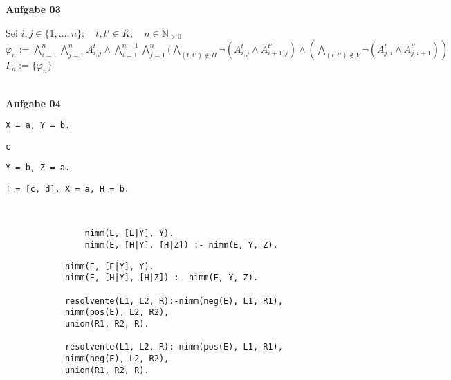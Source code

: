 \documentclass[a4paper,10pt]{article}
\begin{document}
	\textbf{Aufgabe 03}
	\begin{compactenum} [(a)]
		\item Sei $ i,j \in \{1,...,n\}; \quad t,t' \in K; \quad n \in \mathbb{N}_{>0} $\\
		$ \varphi_n := \bigwedge\limits_{i = 1}^n \bigwedge\limits_{j = 1}^n A_{i,j}^t \wedge \bigwedge\limits_{i=1}^{n-1} \bigwedge\limits_{j=1}^n (\bigwedge\limits_{(t,t') \not\in H} \lnot (A_{i,j}^t \wedge A_{i+1,j}^{t'}) \wedge (\bigwedge\limits_{(t,t') \not\in V} \lnot (A_{j,i}^t \wedge A_{j,i+1}^{t'})) $ \\
		$ \Gamma_n := \{\varphi_n\} $
		
		\item 
	\end{compactenum}\ \\

	\textbf{Aufgabe 04}
	\begin{compactenum} [(a)]
		\item \begin{compactenum} [(i)]
			\item \verb|X = a, Y = b.|
			\item \verb|c|
			\item \verb|Y = b, Z = a.|
			\item \verb|T = [c, d], X = a, H = b.|
		\end{compactenum}\
		\item 
		
		\newpage
		\item 
		\begin{verbatim}
				nimm(E, [E|Y], Y).
				nimm(E, [H|Y], [H|Z]) :- nimm(E, Y, Z).
		\end{verbatim}
		\item 
		\begin{verbatim}
			nimm(E, [E|Y], Y).
			nimm(E, [H|Y], [H|Z]) :- nimm(E, Y, Z).
			
			resolvente(L1, L2, R):-nimm(neg(E), L1, R1),
			nimm(pos(E), L2, R2),
			union(R1, R2, R).
			
			resolvente(L1, L2, R):-nimm(pos(E), L1, R1),
			nimm(neg(E), L2, R2),
			union(R1, R2, R).
		\end{verbatim}
		
		
		
		
		
		
		
		
		
		
		
		
	\end{compactenum}
\end{document}
